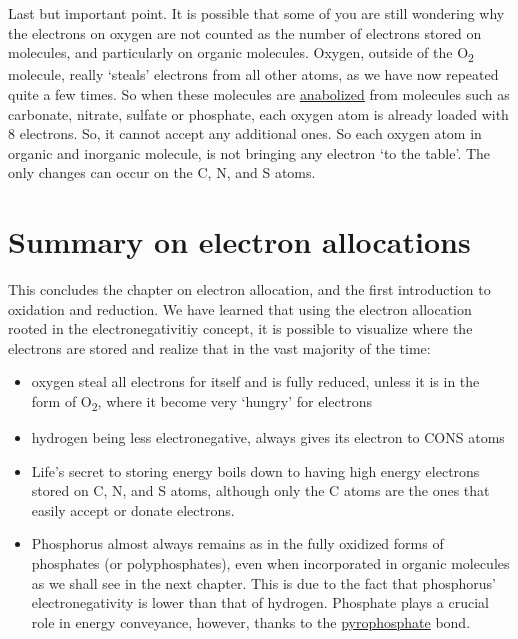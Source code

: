 \documentclass[]{book}
\providecommand{\tightlist}{%
  \setlength{\itemsep}{0pt}\setlength{\parskip}{0pt}}
\theoremstyle{definition}
\theoremstyle{definition}
\theoremstyle{definition}
\theoremstyle{remark}
\begin{document}
Last but important point. It is possible that some of you are still
wondering why the electrons on oxygen are not counted as the number of
electrons stored on molecules, and particularly on organic molecules.
Oxygen, outside of the O\textsubscript{2} molecule, really `steals'
electrons from all other atoms, as we have now repeated quite a few
times. So when these molecules are
\protect\hyperlink{anabolism}{anabolized} from molecules such as
carbonate, nitrate, sulfate or phosphate, each oxygen atom is already
loaded with 8 electrons. So, it cannot accept any additional ones. So
each oxygen atom in organic and inorganic molecule, is not bringing any
electron `to the table'. The only changes can occur on the C, N, and S
atoms.

\section{Summary on electron
allocations}\label{summary-on-electron-allocations}

This concludes the chapter on electron allocation, and the first
introduction to oxidation and reduction. We have learned that using the
electron allocation rooted in the electronegativitiy concept, it is
possible to visualize where the electrons are stored and realize that in
the vast majority of the time:

\begin{itemize}
\tightlist
\item
  oxygen steal all electrons for itself and is fully reduced, unless it
  is in the form of O\textsubscript{2}, where it become very `hungry'
  for electrons
\item
  hydrogen being less electronegative, always gives its electron to CONS
  atoms
\item
  Life's secret to storing energy boils down to having high energy
  electrons stored on C, N, and S atoms, although only the C atoms are
  the ones that easily accept or donate electrons.
\item
  Phosphorus almost always remains as in the fully oxidized forms of
  phosphates (or polyphosphates), even when incorporated in organic
  molecules as we shall see in the next chapter. This is due to the fact
  that phosphorus' electronegativity is lower than that of hydrogen.
  Phosphate plays a crucial role in energy conveyance, however, thanks
  to the
  \protect\hyperlink{atp-or-the-energy-currency-of-the-cell}{pyrophosphate}
  bond.
\end{itemize}
\end{document}
